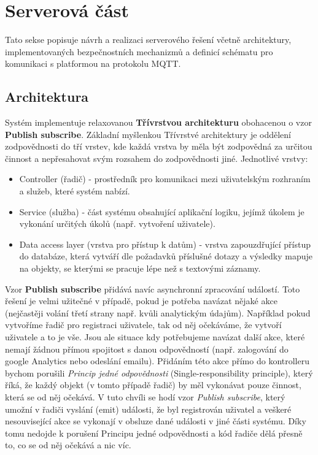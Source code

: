 
\section{Serverová část}
Tato sekse popisuje návrh a realizaci serverového řešení včetně architektury, implementovaných bezpečnostních mechanizmů a definicí schématu pro komunikaci s platformou na protokolu MQTT.


\subsection{Architektura}
Systém implementuje relaxovanou \textbf{Třívrstvou architekturu} obohacenou o vzor \textbf{Publish subscribe}. Základní myšlenkou Třívrstvé architektury je oddělení zodpovědnosti do tří vrstev, kde každá vrstva by měla být zodpovědná za určitou činnost a nepřesahovat svým rozsahem do zodpovědnosti jiné. Jednotlivé vrstvy:
\begin{itemize}
    \item Controller (řadič) - prostředník pro komunikaci mezi uživatelským rozhraním a služeb, které systém nabízí.
    \item Service (služba) - část systému obsahující aplikační logiku, jejímž úkolem je vykonání určitých úkolů (např. vytvoření uživatele).
    \item Data access layer (vrstva pro přístup k datům) - vrstva zapouzdřující přístup do databáze, která vytváří dle požadavků příslušné dotazy a výsledky mapuje na objekty, se kterými se pracuje lépe než s textovými záznamy.
\end{itemize}

Vzor \textbf{Publish subscribe} přidává navíc asynchronní zpracování událostí. Toto řešení je velmi užitečné v případě, pokud je potřeba navázat nějaké akce (nejčastěji volání třetí strany např. kvůli analytickým údajům). Například pokud vytvoříme řadič pro registraci uživatele, tak od něj očekáváme, že vytvoří uživatele a to je vše. Jsou ale situace kdy potřebujeme navázat další akce, které nemají žádnou přímou spojitost s danou odpovědností (např. zalogování do google Analytics nebo odeslání emailu). Přidáním této akce přímo do kontrolleru bychom porušili \textit{Princip jedné odpovědnosti} (Single-responsibility principle), který říká, že každý objekt (v tomto případě řadič) by měl vykonávat pouze činnost, která se od něj očekává. V tuto chvíli se hodí vzor \textit{Publish subscribe}, který umožní v řadiči vyslání (emit) události, že byl registrován uživatel a veškeré nesouvisející akce se vykonají v obsluze dané události v jiné části systému. Díky tomu nedojde k porušení Principu jedné odpovědnosti a kód řadiče dělá přesně to, co se od něj očekává a nic víc.

